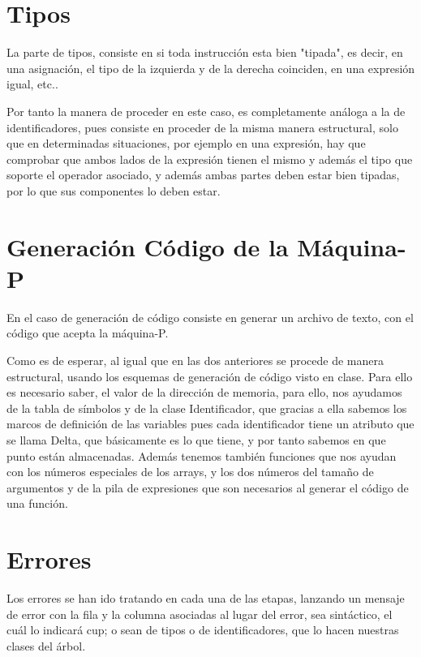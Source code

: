 \documentclass[a4paper, 11pt, twoside, openany, onecolumn, final]{memoir}
\begin{document}
	 \section{Tipos}
	 La parte de tipos, consiste en si toda instrucción esta bien "tipada", es decir, en una asignación, el tipo de la izquierda y de la derecha coinciden, en una expresión igual, etc..
	 
	 Por tanto la manera de proceder en este caso, es completamente análoga a la de identificadores, pues consiste en proceder de la misma manera estructural, solo que en determinadas situaciones, por ejemplo en una expresión, hay que comprobar que ambos lados de la expresión tienen el mismo y además el tipo que soporte el operador asociado, y además ambas partes deben estar bien tipadas, por lo que sus componentes lo deben estar. 
	 \section{Generación Código de la Máquina-P}
	 En el caso de generación de código consiste en generar un archivo de texto, con el código que acepta la máquina-P.
	 
	 Como es de esperar, al igual que en las dos anteriores se procede de manera estructural, usando los esquemas de generación de código visto en clase. Para ello es necesario saber, el valor de la dirección de memoria, para ello, nos ayudamos de la tabla de símbolos y de la clase Identificador, que gracias a ella sabemos los marcos de definición de las variables pues cada identificador tiene un atributo que se llama Delta, que básicamente es lo que tiene, y por tanto sabemos en que punto están almacenadas. Además tenemos también funciones que nos ayudan con los números especiales de los arrays, y los dos números del tamaño de argumentos y de la pila de expresiones que son necesarios al generar el código de una función. 
	 \section{Errores}
	 	Los errores se han ido tratando en cada una de las etapas, lanzando un mensaje de error con la fila y la columna asociadas al lugar del error, sea sintáctico, el cuál lo indicará cup; o sean de tipos o de identificadores, que lo hacen nuestras clases del árbol. 
\end{document}
